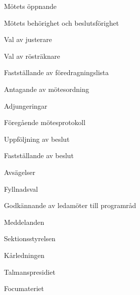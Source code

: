 \documentclass[prelim]{sektionsmote}
\begin{document}
\maketitle

\begin{ootd}

\item{Mötets öppnande}

\item{Mötets behörighet och beslutsförighet}

\item{Val av justerare}

\item{Val av rösträknare}

\item{Fastställande av föredragningslista}

\item{Antagande av mötesordning}

\item{Adjungeringar}

\item{Föregående mötesprotokoll}

\item{Uppföljning av beslut}

\item{Fastställande av beslut}
\begin{ootd}
    \item Avsägelser
    \item Fyllnadsval
    \item Godkännande av ledamöter till programråd
\end{ootd}

\item{Meddelanden}
\begin{ootd}
    \item Sektionsstyrelsen
    \item Kårledningen
    \item Talmanspresidiet
    \item Focumateriet
\end{ootd}


\end{ootd}
\end{document}
